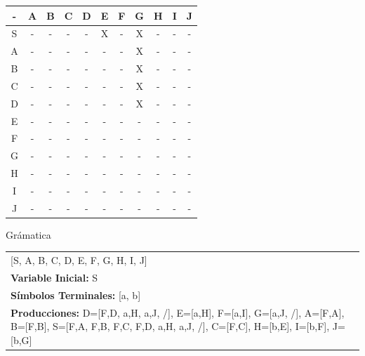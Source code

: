 \documentclass[a4paper,11pt]{article}
\newcommand{\MYp}[1]{ {\color[rgb]{0.392,0.392,0.392}#1} }
\begin{document}
\begin{center}
\begin{tabular}{||c||c||c||c||c||c||c||c||c||c||c||}
\hline
\hline
- & A & B & C & D & E & F & G & H & I & J \\
\hline
\hline
S & - & - & - & - & X & - & X & - & - & - \\
\hline
\hline
A & - & - & - & - & - & - & X & - & - & - \\
\hline
\hline
B & - & - & - & - & - & - & X & - & - & - \\
\hline
\hline
C & - & - & - & - & - & - & X & - & - & - \\
\hline
\hline
D & - & - & - & - & - & - & X & - & - & - \\
\hline
\hline
E & - & - & - & - & - & - & - & - & - & - \\
\hline
\hline
F & - & - & - & - & - & - & - & - & - & - \\
\hline
\hline
G & - & - & - & - & - & - & - & - & - & - \\
\hline
\hline
H & - & - & - & - & - & - & - & - & - & - \\
\hline
\hline
I & - & - & - & - & - & - & - & - & - & - \\
\hline
\hline
J & - & - & - & - & - & - & - & - & - & - \\
\hline
\hline
\end{tabular}
\end{center}

\MYp{\Huge Gr\'amatica}
\newline

\begin{center}\begin{tabular}{ m{15cm} }

\noindent {\bf Variables: }[S, A, B, C, D, E, F, G, H, I, J] \\
{\bf Variable Inicial: }S \\ 
{\bf S\'{i}mbolos Terminales: }[a, b] \\ 
{\bf Producciones: }{D=[F,D, a,H, a,J, /], E=[a,H], F=[a,I], G=[a,J, /], A=[F,A], B=[F,B], S=[F,A, F,B, F,C, F,D, a,H, a,J, /], C=[F,C], H=[b,E], I=[b,F], J=[b,G]} \\ 
\end{tabular}
\end{center}
\end{document}
